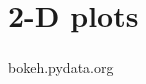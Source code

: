 \section{2-D plots}

\begin{frame}
\frametitle{}

\end{frame}

\begin{frame}
\frametitle{}

\end{frame}

\begin{frame}
\frametitle{}

\end{frame}



bokeh.pydata.org
